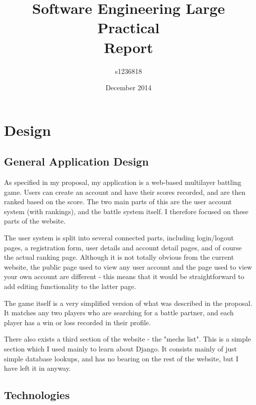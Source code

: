 \documentclass{article}
\begin{document}
\author{s1236818}
\title{Software Engineering Large Practical \\ Report}
\date{December 2014}
\maketitle

\section{Design}
\subsection{General Application Design}

As specified in my proposal, my application is a web-based multilayer battling game. Users can create an account and have their scores recorded, and are then ranked based on the score. The two main parts of this are the user account system (with rankings), and the battle system itself. I therefore focused on these parts of the website. 

The user system is split into several connected parts, including login/logout pages, a registration form, user details and account detail pages, and of course the actual ranking page. Although it is not totally obvious from the current website, the public page used to view any user account and the page used to view your own account are different - this means that it would be straightforward to add editing functionality to the latter page.

The game itself is a very simplified version of what was described in the proposal. It matches any two players who are searching for a battle partner, and each player has a win or loss recorded in their profile.

There also exists a third section of the website - the "mechs list". This is a simple section which I used mainly to learn about Django. It consists mainly of just simple database lookups, and has no bearing on the rest of the website, but I have left it in anyway.

\subsection{Technologies}
\end{document}
